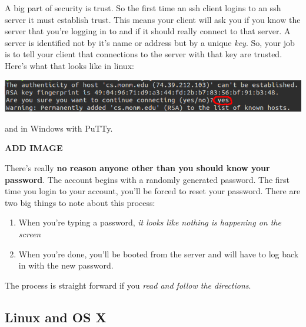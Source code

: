 \documentclass[]{tufte-handout}
\begin{document}
A big part of security is trust. So the first time an ssh client logins to an ssh server it must establish trust.  This means your client will ask you if you know the server that you're logging in to and if it should really connect to that server. A server is identified not by it's name or address but by a unique \textit{key}. So, your job is to tell your client that connections to the server with that key are trusted.  Here's what that looks like in linux:

\vspace{.1in}
\begin{center}
\includegraphics[scale=.5]{linux-knownhost.png}
\end{center}
\vspace{.1in}


and in Windows with PuTTy.

\vspace{.1in}
\begin{center}
\textbf{ADD IMAGE}
\end{center}
\vspace{.1in}

There's really \textbf{no reason anyone other than you should know your password}.  The account begins with a randomly generated password.  The first time you login to your account, you'll be forced to reset your password. There are two big things to note about this process:
\begin{enumerate}
\item When you're typing a password, \textit{it looks like nothing is happening on the screen}
\item When you're done, you'll be booted from the server and will have to log back in with the new password.
\end{enumerate}
The process is straight forward if you \textit{read and follow the directions}.

\subsection{Linux and OS X}
\end{document}
